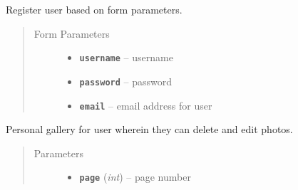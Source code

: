 \documentclass[letterpaper,10pt,english]{sphinxmanual}
\begin{document}
\begin{fulllineitems}
\label{users:post--user-register}
Register user based on form parameters.
\begin{quote}\begin{description}
\item[{Form Parameters}] \leavevmode\begin{itemize}
\item {} 
\textbf{\texttt{username}} -- username

\item {} 
\textbf{\texttt{password}} -- password

\item {} 
\textbf{\texttt{email}} -- email address for user

\end{itemize}

\end{description}\end{quote}

\end{fulllineitems}



\begin{fulllineitems}
\label{users:get--user-gallery-}
Personal gallery for user wherein they can delete and edit photos.
\begin{quote}\begin{description}
\item[{Parameters}] \leavevmode\begin{itemize}
\item {} 
\textbf{\texttt{page}} (\emph{int}) -- page number

\end{itemize}

\end{description}\end{quote}

\end{fulllineitems}
\end{document}
